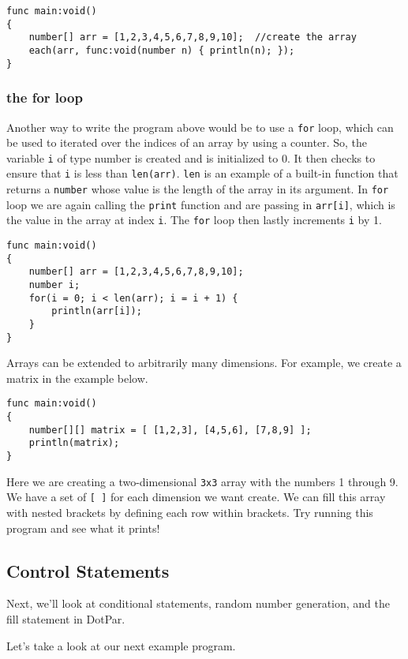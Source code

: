 \documentclass{article}
\begin{document}
\begin{verbatim}
func main:void()
{
    number[] arr = [1,2,3,4,5,6,7,8,9,10];  //create the array
    each(arr, func:void(number n) { println(n); });
}
\end{verbatim}

\subsubsection{the for loop}
Another way to write the program above would be to use a \verb=for= loop, which can be used to iterated over the indices of an array by using a counter. So, the variable \verb=i= of type number is created and is initialized to 0. It then checks to ensure that \verb=i= is less than \verb=len(arr)=. \verb=len= is an example of a built-in function that returns a \verb=number= whose value is the length of the array in its argument. In \verb=for= loop we are again calling the \verb=print= function and are passing in \verb=arr[i]=, which is the value in the array at index \verb=i=. The \verb=for= loop then lastly increments \verb=i= by 1.

\begin{verbatim}
func main:void()
{
    number[] arr = [1,2,3,4,5,6,7,8,9,10];
    number i;
    for(i = 0; i < len(arr); i = i + 1) {
        println(arr[i]);
    }
}
\end{verbatim}

Arrays can be extended to arbitrarily many dimensions. For example, we create a matrix in the example below.

\begin{verbatim}
func main:void()
{
    number[][] matrix = [ [1,2,3], [4,5,6], [7,8,9] ];
    println(matrix);
}
\end{verbatim}

Here we are creating a two-dimensional \verb=3x3= array with the numbers 1 through 9.  We have a  set of \verb=[ ]= for each dimension we want create.  We can fill this array with nested brackets by defining each row within brackets. Try running this program and see what it prints!

\subsection{Control Statements}

Next, we'll look at conditional statements, random number generation, and the fill statement in DotPar. 

Let's take a look at our next example program.
\end{document}
